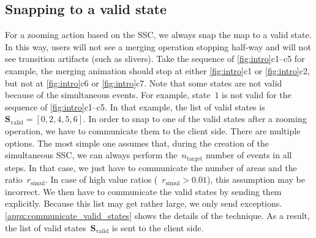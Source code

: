\documentclass[twocolumn]{svjour3}          %
\begin{document}
\subsection{Snapping to a valid state}
\label{sec:snap}

For a zooming action based on the SSC, 
we always snap the map to a valid state.
In this way, users will not see a merging operation stopping half-way
and will not see transition artifacts (such as slivers).
Take the sequence of \fig\ref{fig:intro}c1--c5 for example, 
the merging animation should stop at 
either \ref{fig:intro}c1 or \ref{fig:intro}c2,
but not at \ref{fig:intro}c6 or \ref{fig:intro}c7.
Note that some states are not valid because of the simultaneous events.
For example, state~$1$ is not valid 
for the sequence of \fig\ref{fig:intro}c1--c5.
In that example, the list of valid states 
is~$\mathrm{\textbf{S}_{valid}} = [0, 2, 4, 5, 6]$.
In order to snap to one of the valid states after a zooming operation,
we have to communicate them to the client side. 
There are multiple options. 
The most simple one assumes that, 
during the creation of the simultaneous SSC, 
we can always perform the~$n_\mathrm{target}$ number of events in all steps. 
In that case, we just have to communicate 
the number of areas and the ratio~$r_\mathrm{simul}$. 
In case of high value ratios (\eg~$r_\mathrm{simul} > 0.01$), 
this assumption may be incorrect. 
We then have to communicate the valid states by sending them explicitly. 
Because this list may get rather large,
we only send exceptions.
\appx\ref{appx:communicate_valid_states} shows the details of the technique.
As a result, the list of valid states~$\mathrm{\textbf{S}_{valid}}$ 
is sent to the client side.
\end{document}
